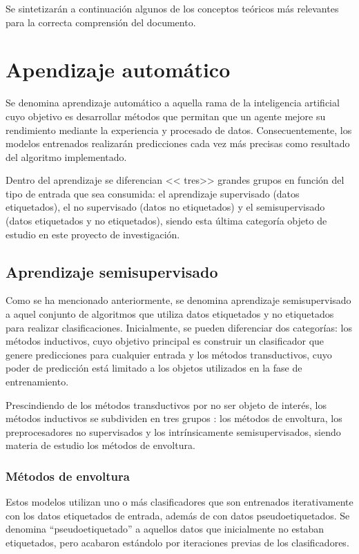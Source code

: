 
Se sintetizarán a continuación algunos de los conceptos teóricos más relevantes para la correcta comprensión del documento.

\section{Apendizaje automático}

Se denomina aprendizaje automático a aquella rama de la inteligencia artificial cuyo objetivo es desarrollar métodos que permitan que un agente mejore su rendimiento mediante la experiencia y procesado de datos. Consecuentemente, los modelos entrenados realizarán predicciones cada vez más precisas como resultado del algoritmo implementado.

Dentro del aprendizaje se diferencian << tres>> grandes grupos en función del tipo de entrada que sea consumida: el aprendizaje supervisado (datos etiquetados), el no supervisado (datos no etiquetados) y el semisupervisado (datos etiquetados y no etiquetados), siendo esta última categoría objeto de estudio en este proyecto de investigación. 

\subsection{Aprendizaje semisupervisado}

Como se ha mencionado anteriormente, se denomina aprendizaje semisupervisado a aquel conjunto de algoritmos que utiliza datos etiquetados y no etiquetados para realizar clasificaciones. Inicialmente, se pueden diferenciar dos categorías: los métodos inductivos, cuyo objetivo principal es construir un clasificador que genere predicciones para cualquier entrada y los métodos transductivos, cuyo poder de predicción está limitado a los objetos utilizados en la fase de entrenamiento.

Prescindiendo de los métodos transductivos por no ser objeto de interés, los métodos inductivos se subdividen en tres grupos \cite{}: los métodos de envoltura, los preprocesadores no supervisados y los intrínsicamente semisupervisados, siendo materia de estudio los métodos de envoltura. 


\subsubsection{Métodos de envoltura}

Estos modelos utilizan uno o más clasificadores que son entrenados iterativamente con los datos etiquetados de entrada, además de con datos pseudoetiquetados. Se denomina “pseudoetiquetado” a aquellos datos que inicialmente no estaban etiquetados, pero acabaron estándolo por iteraciones previas de los clasificadores.

